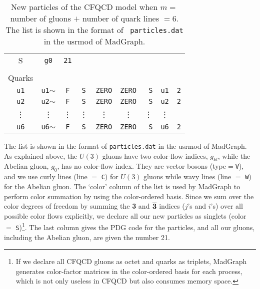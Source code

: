 \begin{table*}
\begin{tabular}{ccccccccc}
{			 S}&{\tt g0}&{\tt 21}\\\\
Quarks\\
{\tt u1}&{\tt u1{\footnotesize $\sim$}}& {\tt F}&{\tt S}& {\tt ZERO} &{\tt ZERO}&{\tt
			 S}&{\tt u1}&{\tt 2}\\
{\tt u2}&{\tt u2{\footnotesize $\sim$}}& {\tt F}&{\tt S}& {\tt ZERO} &{\tt ZERO}&{\tt
			 S}&{\tt u2}&{\tt 2}\\
\vdots&\vdots&\vdots&\vdots&\vdots&\vdots&\vdots&\vdots&\\
{\tt u6}&{\tt u6{\footnotesize $\sim$}}& {\tt F}&{\tt S}& {\tt ZERO} &{\tt ZERO}&{\tt
			 S}&{\tt u6}&{\tt 2}\\
\hline\hline
\end{tabular}
\caption{New particles of the CFQCD model when $m =$ number of gluons
 $+$ number of quark lines $=6$. The list is shown in the format of {\tt
 particles.dat} in the usrmod of MadGraph\cite{MG/ME}.}
\label{tb:particles}
\end{table*}
 The list is shown in the format of
{\tt particles.dat} in the usrmod of MadGraph\cite{MG/ME}. As
explained above, the $U(3)$ gluons have two color-flow indices,
$g_{kl}$,
while the Abelian gluon, $g_0$, has no
color-flow index. They are vector bosons (type$=${\tt V}), and we use
curly lines (line $=$ {\tt C}) for $U(3)$ gluons while wavy lines (line
$=$ {\tt W}) for the Abelian gluon. The `color' column of the list is
used by MadGraph to perform color summation by using the color-ordered
basis. Since we sum over the color degrees of freedom by summing the {\bf
3} and $\overline{{\bf 3}}$ indices ($j$'s and $i$'s) over all possible color
flows explicitly, we declare all our new particles as singlets (color
$=$ {\tt S})\footnote{If we declare all CFQCD gluons as octet and
quarks as triplets, MadGraph generates color-factor matrices in the
color-ordered basis for each
process, which is not only useless in CFQCD but also consumes memory space.}.
The last column gives the PDG code for the particles, and
all our gluons, including the Abelian gluon, are given the number 21.

